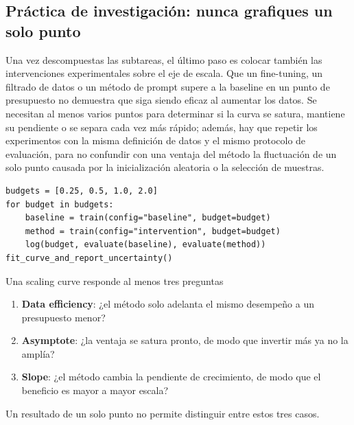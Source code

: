 
\subsection{Práctica de investigación: nunca grafiques un solo punto}

Una vez descompuestas las subtareas, el último paso es colocar también las intervenciones experimentales sobre el eje de escala. Que un fine-tuning, un filtrado de datos o un método de prompt supere a la baseline en un punto de presupuesto no demuestra que siga siendo eficaz al aumentar los datos. Se necesitan al menos varios puntos para determinar si la curva se satura, mantiene su pendiente o se separa cada vez más rápido; además, hay que repetir los experimentos con la misma definición de datos y el mismo protocolo de evaluación, para no confundir con una ventaja del método la fluctuación de un solo punto causada por la inicialización aleatoria o la selección de muestras.


\begin{lstlisting}[caption={Comparación de las scaling curves de una intervención de investigación y de la baseline}]
budgets = [0.25, 0.5, 1.0, 2.0]
for budget in budgets:
    baseline = train(config="baseline", budget=budget)
    method = train(config="intervention", budget=budget)
    log(budget, evaluate(baseline), evaluate(method))
fit_curve_and_report_uncertainty()
\end{lstlisting}

\begin{importantbox}{Una scaling curve responde al menos tres preguntas}
\begin{enumerate}
  \item \textbf{Data efficiency}: ¿el método solo adelanta el mismo desempeño a un presupuesto menor?
  \item \textbf{Asymptote}: ¿la ventaja se satura pronto, de modo que invertir más ya no la amplía?
  \item \textbf{Slope}: ¿el método cambia la pendiente de crecimiento, de modo que el beneficio es mayor a mayor escala?
\end{enumerate}
Un resultado de un solo punto no permite distinguir entre estos tres casos.
\end{importantbox}

